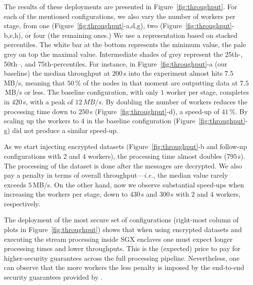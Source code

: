 The results of these deployments are presented in Figure~\ref{fig:throughput}.
For each of the mentioned configurations, we also vary the number of workers per stage, from one (Figure~\ref{fig:throughput}-a,d,g), two (Figure~\ref{fig:throughput}-b,e,h), or four (the remaining ones.)
We use a representation based on stacked percentiles.
The white bar at the bottom represents the minimum value, the pale grey on top the maximal value.
Intermediate shades of grey represent the 25th-, 50th–, and 75th-percentiles.
For instance, in Figure~\ref{fig:throughput}-a (our baseline) the median throughput at $200$\,s into the experiment almost hits $7.5$\,MB/s, meaning that $50$\,\% of the nodes in that moment are outputting data at $7.5$\,MB/s or less.
The baseline configuration, with only $1$ worker per stage, completes in $420$\,s, with a peak of $12\,MB/s$.
By doubling the number of workers reduces the processing time down to $250$\,s (Figure~\ref{fig:throughput}-d), a speed-up of $41$\,\%.
By scaling up the workers to 4 in the baseline configuration (Figure~\ref{fig:throughput}-g) did not produce a similar speed-up.

As we start injecting encrypted datasets (Figure~\ref{fig:throughput}-b and follow-up configurations with 2 and 4 workers), the processing time almost doubles ($795$\,s).
The processing of the dataset is done after the messages are decrypted.
We also pay a penalty in terms of overall throughput---\emph{i.e.}, the median value rarely exceeds $5$\,MB/s.
On the other hand, now we observe substantial speed-ups when increasing the workers per stage, down to $430$\,s and $300$\,s with $2$ and $4$ workers, respectively.

The deployment of the most secure set of configurations (right-most column of plots in Figure~\ref{fig:throughput}) shows that when using encrypted datasets and executing the stream processing inside SGX enclaves one must expect longer processing times and lower throughputs.
This is the (expected) price to pay for higher-security guarantees across the full processing pipeline.
Nevertheless, one can observe that the more workers the less penalty is imposed by the end-to-end security guarantees provided by \SYS{}.

